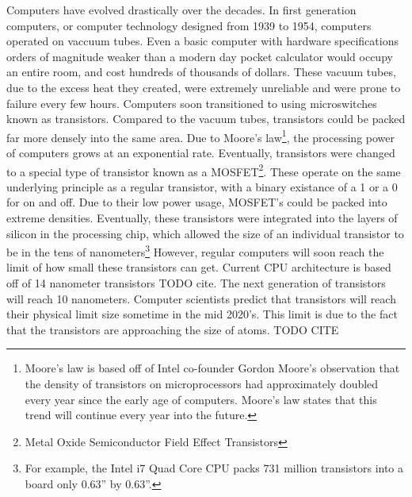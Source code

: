 \documentclass[10pt,journal,compsoc]{IEEEtran}
\begin{document}
Computers have evolved drastically over the decades. In first generation computers, or computer technology designed from 1939 to 1954, computers operated on vaccuum tubes. Even a basic computer with hardware specifications orders of magnitude weaker than a modern day pocket calculator would occupy an entire room, and cost hundreds of thousands of dollars.
These vacuum tubes, due to the excess heat they created, were extremely unreliable and were prone to failure every few hours. Computers soon transitioned to using microswitches known as transistors.  Compared to the vacuum tubes, transistors could be packed far more densely into the same area. Due to Moore's law\footnote{Moore's law is based off of Intel co-founder Gordon Moore's observation that the density of transistors on microprocessors had approximately doubled every year since the early age of computers. Moore's law states that this trend will continue every year into the future.}, the processing power of computers grows at an exponential rate. Eventually, transistors were changed to a special type of transistor known as a MOSFET\footnote{Metal Oxide Semiconductor Field Effect Transistors}. These operate on the same underlying principle as a regular transistor, with a binary existance of a 1 or a 0 for on and off. Due to their low power usage, MOSFET's could be packed into extreme densities. Eventually, these transistors were integrated into the layers of silicon in the processing chip, which allowed the size of an individual transistor to be in the tens of nanometers\footnote{For example, the Intel i7 Quad Core CPU packs 731 million transistors into a board only 0.63'' by 0.63''.}
However, regular computers will soon reach the limit of how small these transistors can get. Current CPU architecture is based off of 14 nanometer transistors TODO cite. The next generation of transistors will reach 10 nanometers. Computer scientists predict that transistors will reach their physical limit size sometime in the mid 2020's. This limit is due to the fact that the transistors are approaching the size of atoms. TODO CITE

\end{document}
